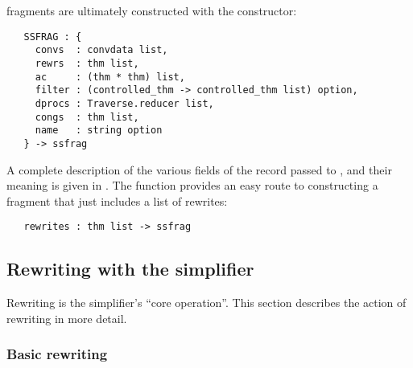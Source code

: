 \Simpset{} fragments are ultimately constructed with the 
constructor:
\begin{hol}
\begin{verbatim}
   SSFRAG : {
     convs  : convdata list,
     rewrs  : thm list,
     ac     : (thm * thm) list,
     filter : (controlled_thm -> controlled_thm list) option,
     dprocs : Traverse.reducer list,
     congs  : thm list,
     name   : string option
   } -> ssfrag
\end{verbatim}
\end{hol}
A complete description of the various fields of the record passed to
, and their meaning is given in \REFERENCE.  The
 function provides an easy route to constructing a
fragment that just includes a list of rewrites:
\begin{hol}
\begin{verbatim}
   rewrites : thm list -> ssfrag
\end{verbatim}
\end{hol}

\subsection{Rewriting with the simplifier}
\label{sec:simplifier-rewriting}

Rewriting is the simplifier's ``core operation''.  This section
describes the action of rewriting in more detail.


\subsubsection{Basic rewriting}
\label{sec:basic-rewriting}

